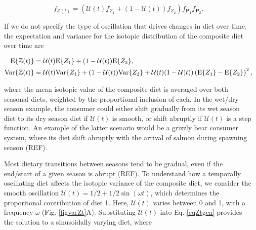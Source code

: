 \documentclass{frontiersSCNS}
\begin{document}

\begin{equation}
  f_{\mathbb{Z}(t)} = \left(\mathcal{U}(t) f_{Z_1} + (1-\mathcal{U}(t)) f_{Z_2}\right)f_{\bm P_1}f_{\bm P_2}.
\end{equation}


If we do not specify the type of oscillation that drives changes in diet over time, the expectation and variance for the isotopic distribution of the composite diet over time are

\begin{align}
  \label{eqZtgen}
  \begin{split}
    {\rm E}\{\mathbb{Z}(t)\} &= \mathcal{U}(t){\rm E}\{Z_1\} + (1-\mathcal{U}(t)){\rm E}\{Z_2\}, \\
    {\rm Var}\{\mathbb{Z}(t)\} &= \mathcal{U}(t){\rm Var}\{Z_1\} + (1-\mathcal{U}(t)){\rm Var}\{Z_2\} + \mathcal{U}(t)(1-\mathcal{U}(t))\left({\rm E}\{Z_1\} - {\rm E}\{Z_2\}\right)^2,
  \end{split}
\end{align}

\noindent where the mean isotopic value of the composite diet is averaged over both seasonal diets, weighted by the proportional inclusion of each.
In the wet/dry season example, the consumer could either shift gradually from its wet season diet to its dry season diet if $\mathcal{U}(t)$ is smooth, or shift abruptly if $\mathcal{U}(t)$ is a step function.
An example of the latter scenario would be a grizzly bear consumer system, where its diet shift abruptly with the arrival of salmon during spawning season (REF).


Most dietary transitions between seasons tend to be gradual, even if the end/start of a given season is abrupt (REF).
To understand how a temporally oscillating diet affects the isotopic variance of the composite diet, we consider the smooth oscillation $\mathcal{U}(t) = 1/2 + 1/2\sin(\omega t)$, which determines the proporitonal contribution of diet 1.
Here, $\mathcal{U}(t)$ varies between 0 and 1, with a frequency $\omega$ (Fig. \ref{figvarZt}A).
Substituting $\mathcal{U}(t)$ into Eq. \ref{eqZtgen} provides the solution to a sinusoidally varying diet, where
\end{document}
